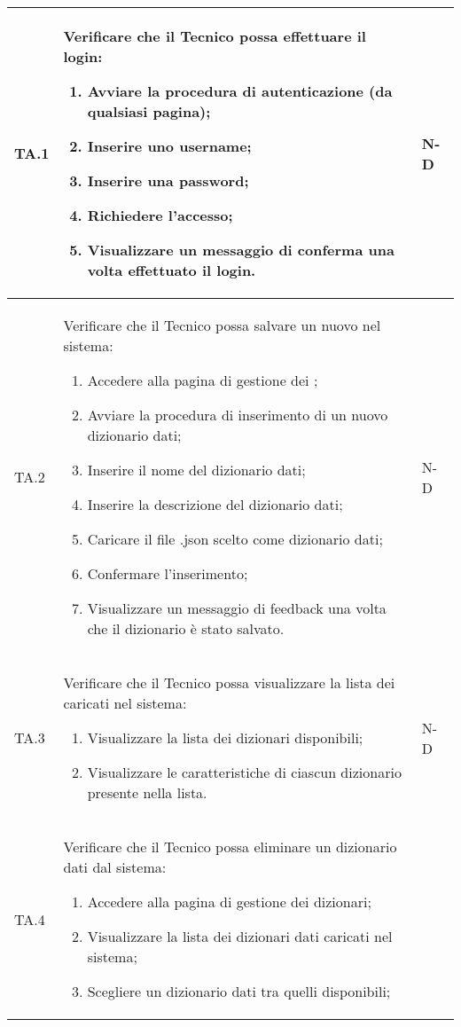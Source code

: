 \begin{adjustwidth}{-0.5cm}{-0.5cm}
\begin{longtable}{|P{1.5cm}|>{\raggedright}P{9.5cm}|>{\arraybackslash}P{1.5cm}|}
		TA.1 & Verificare che il Tecnico possa effettuare il login:
		\begin{enumerate}
			\item Avviare la procedura di autenticazione (da qualsiasi pagina);
			\item Inserire uno username;
			\item Inserire una password;
			\item Richiedere l'accesso;
			\item Visualizzare un messaggio di conferma una volta effettuato il login.
		\end{enumerate}
		& N-D \\
		\hline TA.2 & Verificare che il Tecnico possa salvare un nuovo  nel sistema:
		\begin{enumerate}
			\item Accedere alla pagina di gestione dei ;
			\item Avviare la procedura di inserimento di un nuovo dizionario dati;
			\item Inserire il nome del dizionario dati;
			\item Inserire la descrizione del dizionario dati;
			\item Caricare il file .json scelto come dizionario dati;
			\item Confermare l'inserimento;
			\item Visualizzare un messaggio di feedback una volta che il dizionario è stato salvato.
		\end{enumerate}
		& N-D \\
		\hline TA.3 & Verificare che il Tecnico possa visualizzare la lista dei  caricati nel sistema:
		\begin{enumerate}
			\item Visualizzare la lista dei dizionari disponibili;
			\item Visualizzare le caratteristiche di ciascun dizionario presente nella lista.
		\end{enumerate}
		& N-D \\
		\hline TA.4 & Verificare che il Tecnico possa eliminare un dizionario dati dal sistema:
		\begin{enumerate}
			\item Accedere alla pagina di gestione dei dizionari;
			\item Visualizzare la lista dei dizionari dati caricati nel sistema;
			\item Scegliere un dizionario dati tra quelli disponibili;

\end{enumerate}
\end{longtable}
\end{adjustwidth}
